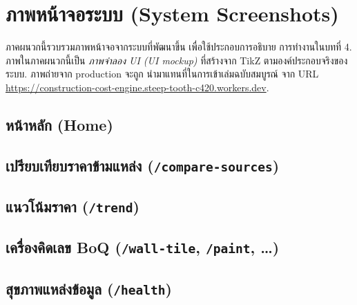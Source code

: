 \chapter{ภาพหน้าจอระบบ (System Screenshots)}
\label{app:screenshots}

ภาคผนวกนี้รวบรวมภาพหน้าจอจากระบบที่พัฒนาขึ้น เพื่อใช้ประกอบการอธิบาย
การทำงานในบทที่ 4. ภาพในภาคผนวกนี้เป็น \emph{ภาพจำลอง UI (UI mockup)}
ที่สร้างจาก TikZ ตามองค์ประกอบจริงของระบบ. ภาพถ่ายจาก production จะถูก
นำมาแทนที่ในการเข้าเล่มฉบับสมบูรณ์ จาก URL
\url{https://construction-cost-engine.steep-tooth-c420.workers.dev}.

\section{หน้าหลัก (Home)}


\section{เปรียบเทียบราคาข้ามแหล่ง (\texttt{/compare-sources})}


\section{แนวโน้มราคา (\texttt{/trend})}


\section{เครื่องคิดเลข BoQ (\texttt{/wall-tile}, \texttt{/paint}, \ldots)}


\section{สุขภาพแหล่งข้อมูล (\texttt{/health})}


